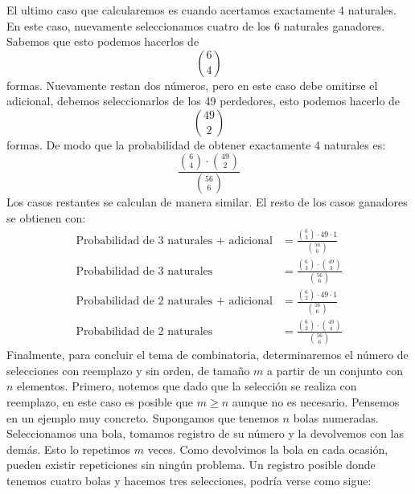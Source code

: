 \documentclass[14pt]{extreport}
\newcounter{ejemplo}[chapter]
\begin{document}
El ultimo caso que calcularemos es cuando acertamos exactamente 4 naturales. En este caso, nuevamente seleccionamos cuatro de los 6 naturales ganadores. Sabemos que esto podemos hacerlos de 
$$
\binom{6}{4}
$$ 
formas. Nuevamente restan dos números, pero en este caso debe omitirse el adicional, debemos seleccionarlos de los 49 perdedores, esto podemos hacerlo de
$$
\binom{49}{2}
$$
formas. De modo que la probabilidad de obtener exactamente 4 naturales es:
$$
\frac{\binom{6}{4}\cdot \binom{49}{2}}{\binom{56}{6}}
$$
Los casos restantes se calculan de manera similar. El resto de los casos ganadores se obtienen con:
\begin{align*}
  \text{Probabilidad de 3 naturales + adicional} & = \frac{\binom{6}{3}\cdot 49 \cdot 1}{\binom{56}{6}}\\
  \text{Probabilidad de 3 naturales} & = \frac{\binom{6}{3}\cdot \binom{49}{3}}{\binom{56}{6}}\\
  \text{Probabilidad de 2 naturales + adicional} & = \frac{\binom{6}{2}\cdot 49 \cdot 1}{\binom{56}{6}}\\
  \text{Probabilidad de 2 naturales} & = \frac{\binom{6}{2}\cdot \binom{49}{4}}{\binom{56}{6}}
\end{align*}
Finalmente, para concluir el tema de combinatoria, determinaremos el número de selecciones con reemplazo y sin orden, de tamaño $m$ a partir de un conjunto con $n$ elementos. Primero, notemos que dado que la selección se realiza con reemplazo, en este caso es posible que $m \geq n$ aunque no es necesario. Pensemos en un ejemplo muy concreto. Supongamos que tenemos $n$ bolas numeradas. Seleccionamos una bola, tomamos registro de su número y la devolvemos con las demás. Esto lo repetimos $m$ veces. Como devolvimos la bola en cada ocasión, pueden existir repeticiones sin ningún problema. Un registro posible donde  tenemos cuatro bolas y hacemos tres selecciones, podría verse como sigue:
\end{document}
